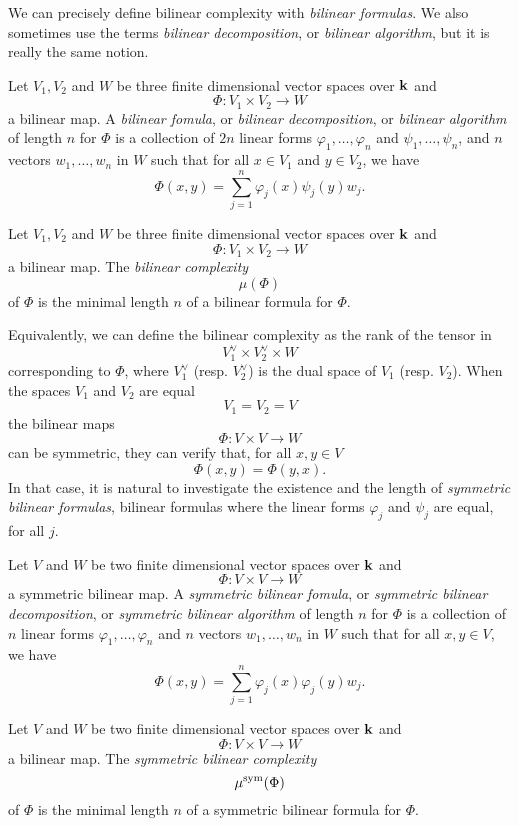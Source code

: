 We can precisely define bilinear complexity with \emph{bilinear formulas}. We
also sometimes use the terms \emph{bilinear decomposition}, or \emph{bilinear
algorithm}, but it is really the same notion.
\begin{defi}
  Let $V_1, V_2$ and $W$ be three finite dimensional vector spaces over $\mathbf{k}$ and 
  \[
    \Phi:V_1\times V_2\to W
  \]
  a bilinear map. A \emph{bilinear fomula}, or \emph{bilinear decomposition}, or
  \emph{bilinear algorithm} of length $n$ for $\Phi$ is a
  collection of $2n$ linear forms $\varphi_1, \dots, \varphi_n$ and $\psi_1,
  \dots, \psi_n$, and $n$ vectors $w_1, \dots, w_n$ in $W$ such that for all
  $x\in V_1$ and $y\in V_2$, we have
  \[
    \Phi(x, y) = \sum_{j=1}^n \varphi_j(x)\psi_j(y)w_j.
  \]
\end{defi}
\begin{defi}
  Let $V_1, V_2$ and $W$ be three finite dimensional vector spaces over $\mathbf{k}$ and 
  \[
    \Phi:V_1\times V_2\to W
  \]
  a bilinear map. The \emph{bilinear complexity} 
  \[
    \mu(\Phi)
  \]
  of $\Phi$ is the minimal length $n$ of a bilinear formula for $\Phi$.
\end{defi}
Equivalently, we can define the bilinear complexity as the rank of the tensor in 
\[
  V_1^\vee \times V_2^\vee \times W
\]
corresponding to $\Phi$, where $V_1^\vee$ (resp. $V_2^\vee$) is the dual space
of $V_1$ (resp. $V_2$). When the spaces $V_1$ and $V_2$ are equal
\[
  V_1 = V_2 = V
\]
the bilinear maps 
\[
  \Phi:V\times V\to W
\]
can be symmetric, \ie they can verify that, for all $x, y\in V$
\[
  \Phi(x, y) = \Phi(y, x).
\]
In that case, it is natural to investigate the existence and the length of
\emph{symmetric bilinear formulas}, \ie bilinear formulas where the linear forms
$\varphi_j$ and $\psi_j$ are equal, for all $j$.
\begin{defi}
  Let $V$ and $W$ be two finite dimensional vector spaces over $\mathbf{k}$ and 
  \[
    \Phi:V\times V\to W
  \]
  a symmetric bilinear map. A \emph{symmetric bilinear fomula}, or
  \emph{symmetric bilinear decomposition}, or
  \emph{symmetric bilinear algorithm} of length $n$ for $\Phi$ is a
  collection of $n$ linear forms $\varphi_1, \dots, \varphi_n$
  and $n$ vectors $w_1, \dots, w_n$ in $W$ such that for all
  $x, y\in V$, we have
  \[
    \Phi(x, y) = \sum_{j=1}^n \varphi_j(x)\varphi_j(y)w_j.
  \]
\end{defi}
\begin{defi}
  Let $V$ and $W$ be two finite dimensional vector spaces over $\mathbf{k}$ and 
  \[
    \Phi:V\times V\to W
  \]
  a bilinear map. The \emph{symmetric bilinear complexity} 
  \[
    \mu^{\textrm{sym}}(\Phi)
  \]
  of $\Phi$ is the minimal length $n$ of a symmetric bilinear formula for $\Phi$.
\end{defi}


